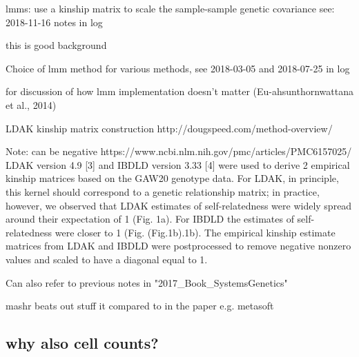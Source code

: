 lmms: use a kinship matrix to scale the sample-sample genetic covariance
see: 2018-11-16 notes in log

this is good background

Choice of lmm method
for various methods, see 2018-03-05 and 2018-07-25 in log

for discussion of how lmm implementation doesn't matter (Eu-ahsunthornwattana et al., 2014)

LDAK kinship matrix construction http://dougspeed.com/method-overview/

Note: can be negative
https://www.ncbi.nlm.nih.gov/pmc/articles/PMC6157025/
LDAK version 4.9 [3] and IBDLD version 3.33 [4] were used to derive 2 empirical kinship matrices based on the GAW20 genotype data. For LDAK, in principle, this kernel should correspond to a genetic relationship matrix; in practice, however, we observed that LDAK estimates of self-relatedness were widely spread around their expectation of 1 (Fig. 1a). For IBDLD the estimates of self-relatedness were closer to 1 (Fig. ​(Fig.1b).1b). The empirical kinship estimate matrices from LDAK and IBDLD were postprocessed to remove negative nonzero values and scaled to have a diagonal equal to 1.

Can also refer to previous notes in "2017\_Book\_SystemsGenetics"

mashr beats out stuff it compared to in the paper e.g. metasoft

\subsection{why also cell counts?}


